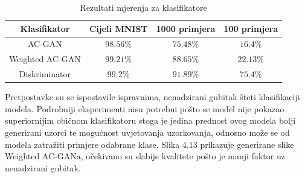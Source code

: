 \documentclass[times, utf8, diplomski]{fer}
\begin{document}
\begin{table}[H]
\caption{Rezultati mjerenja za klasifikatore}
\centering
\begin{tabular}{c c c c}
\hline\hline %
Klasifikator & Cijeli MNIST & 1000 primjera & 100 primjera \\ [0.5ex] %
\hline %
AC-GAN & $98.56\%$ & $75.48\%$ & $16.4\%$ \\
Weighted AC-GAN & $99.21\%$ & $88.65\%$ & $22.13\%$ \\
Diskriminator & $99.2\%$ & $91.89\%$ & $75.4\%$ \\ [1ex] %
\hline %
\end{tabular}
\end{table}

Pretpostavke su se ispostavile ispravnima, nenadzirani gubitak šteti klasifikaciji modela. Podrobniji eksperimenti nisu potrebni pošto se model nije pokazao superiornijim običnom klasifikatoru stoga je jedina prednost ovog modela bolji generirani uzorci te mogućnost uvjetovanja uzorkovanja, odnosno može se od modela zatražiti primjere odabrane klase. Slika 4.13 prikazuje generirane slike Weighted AC-GANa, očekivano su slabije kvalitete pošto je manji faktor uz nenadzirani gubitak.
\end{document}
